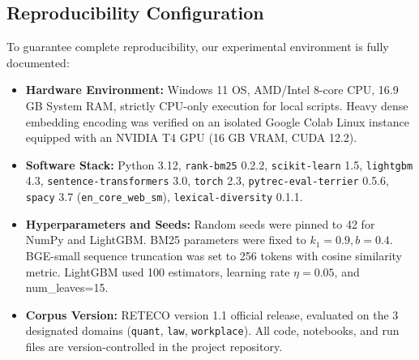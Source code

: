 \subsection{Reproducibility Configuration}
To guarantee complete reproducibility, our experimental environment is fully documented:
\begin{itemize}
    \item \textbf{Hardware Environment:} Windows 11 OS, AMD/Intel 8-core CPU, 16.9 GB System RAM, strictly CPU-only execution for local scripts. Heavy dense embedding encoding was verified on an isolated Google Colab Linux instance equipped with an NVIDIA T4 GPU (16 GB VRAM, CUDA 12.2).
    \item \textbf{Software Stack:} Python 3.12, \texttt{rank-bm25} 0.2.2, \texttt{scikit-learn} 1.5, \texttt{lightgbm} 4.3, \texttt{sentence-transformers} 3.0, \texttt{torch} 2.3, \texttt{pytrec-eval-terrier} 0.5.6, \texttt{spacy} 3.7 (\texttt{en\_core\_web\_sm}), \texttt{lexical-diversity} 0.1.1.
    \item \textbf{Hyperparameters and Seeds:} Random seeds were pinned to 42 for NumPy and LightGBM. BM25 parameters were fixed to $k_1=0.9, b=0.4$. BGE-small sequence truncation was set to 256 tokens with cosine similarity metric. LightGBM used 100 estimators, learning rate $\eta=0.05$, and num\_leaves=15.
    \item \textbf{Corpus Version:} RETECO version 1.1 official release, evaluated on the 3 designated domains (\texttt{quant}, \texttt{law}, \texttt{workplace}). All code, notebooks, and run files are version-controlled in the project repository.
\end{itemize}
